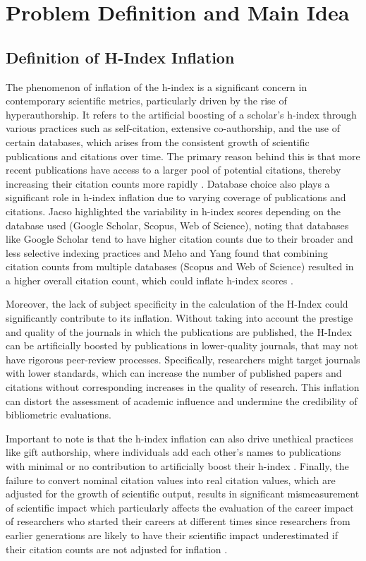 \chapter{Problem Definition and Main Idea}
\label{ch:problem}

\section{Definition of H-Index Inflation}
The phenomenon of inflation of the h-index is a significant concern in
contemporary scientific metrics, particularly driven by the rise of
hyperauthorship. It refers to the artificial boosting of a scholar's h-index
through various practices such as self-citation, extensive co-authorship, and
the use of certain databases, which arises from the consistent growth of
scientific publications and citations over time. The primary reason behind this
is that more recent publications have access to a larger pool of potential
citations, thereby increasing their citation counts more rapidly
\cite{norris2010h, koltun2021h, bi2023four}. Database choice also plays a
significant role in h-index inflation due to varying coverage of publications
and citations. Jacso highlighted the variability in h-index scores depending on
the database used (Google Scholar, Scopus, Web of Science), noting that
databases like Google Scholar tend to have higher citation counts due to their
broader and less selective indexing practices and Meho and Yang found that
combining citation counts from multiple databases (Scopus and Web of Science)
resulted in a higher overall citation count, which could inflate h-index scores
\cite{norris2010h}.

Moreover, the lack of subject specificity in the calculation of the H-Index
could significantly contribute to its inflation. Without taking into account
the prestige and quality of the journals in which the publications are
published, the H-Index can be artificially boosted by publications in
lower-quality journals, that may not have rigorous peer-review processes.
Specifically, researchers might target journals with lower standards, which can
increase the number of published papers and citations without corresponding
increases in the quality of research. This inflation can distort the assessment
of academic influence and undermine the credibility of bibliometric
evaluations.

Important to note is that the h-index inflation can also drive unethical
practices like gift authorship, where individuals add each other’s names to
publications with minimal or no contribution to artificially boost their
h-index \cite{bi2023four}. Finally, the failure to convert nominal citation
values into real citation values, which are adjusted for the growth of
scientific output, results in significant mismeasurement of scientific impact
which particularly affects the evaluation of the career impact of researchers
who started their careers at different times since researchers from earlier
generations are likely to have their scientific impact underestimated if their
citation counts are not adjusted for inflation \cite{petersen2019methods}.

